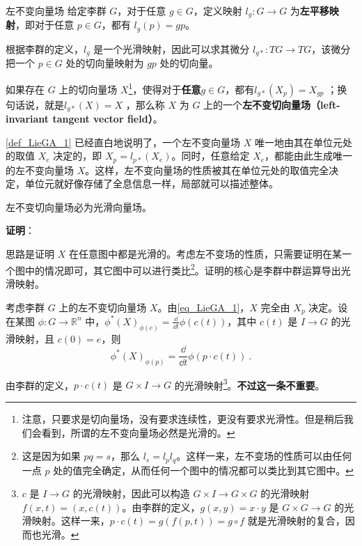 \begin{definition}{左不变向量场}\label{def_LieGA_1}
给定李群 $G$，对于任意 $g\in G$，定义映射 $l_g:G\to G$ 为\textbf{左平移映射}，即对于任意 $p\in G$，都有 $l_g(p)=gp$。

根据李群的定义，$l_g$ 是一个光滑映射，因此可以求其微分 $l_{g*}:TG\to TG$，该微分把一个 $p\in G$ 处的切向量映射为 $gp$ 处的切向量。

如果存在 $G$ 上的切向量场 $X$\footnote{注意，只要求是切向量场，没有要求连续性，更没有要求光滑性。但是稍后我们会看到，所谓的左不变向量场必然是光滑的。}，使得对于\textbf{任意}$g\in G$，都有$l_{g*}(X_p)=X_{gp}$ ；换句话说，就是$l_{g*}(X)=X$ ，那么称 $X$ 为 $G$ 上的一个\textbf{左不变切向量场（left-invariant tangent vector field）}。
\end{definition}

\autoref{def_LieGA_1} 已经直白地说明了，一个左不变向量场 $X$ 唯一地由其在单位元处的取值 $X_e$ 决定的，即 $X_p=l_{p*}(X_e)$。同时，任意给定 $X_e$，都能由此生成唯一的左不变向量场 $X$。这样，左不变向量场的性质被其在单位元处的取值完全决定，单位元就好像存储了全息信息一样，局部就可以描述整体。

\begin{theorem}{}
左不变切向量场必为光滑向量场。
\end{theorem}

\textbf{证明}：




思路是证明 $X$ 在任意图中都是光滑的。考虑左不变场的性质，只需要证明在某一个图中的情况即可，其它图中可以进行类比\footnote{这是因为如果 $pq=s$，那么 $l_{s}=l_pl_q$。这样一来，左不变场的性质可以由任何一点 $p$ 处的值完全确定，从而任何一个图中的情况都可以类比到其它图中。}。证明的核心是李群中群运算导出光滑映射。

考虑李群 $G$ 上的左不变切向量场 $X$。由\autoref{eq_LieGA_1}，$X$ 完全由 $X_p$ 决定。设在某图 $\phi: G\to\mathbb{R}^n$ 中，$\phi^*(X)_{\phi(e)}=\frac{\dd }{\dd t}\phi(c(t))$，其中 $c(t)$ 是 $I\to G$ 的光滑映射，且 $c(0)=e$，则
\begin{equation}\label{eq_LieGA_2}
\phi^*(X)_{\phi(p)}=\frac{\dd}{\dd t}\phi(p\cdot c(t))~.
\end{equation}

由李群的定义，$p\cdot c(t)$ 是 $G\times I\to G$ 的光滑映射\footnote{$c$ 是 $I\to G$ 的光滑映射，因此可以构造 $G\times I\to G\times G$ 的光滑映射 $f(x, t)=(x, c(t))$。由李群的定义，$g(x, y)=x\cdot y$ 是 $G\times G\to G$ 的光滑映射。这样一来，$p\cdot c(t)=g(f(p, t))=g\circ f$ 就是光滑映射的复合，因而也光滑。}。\textbf{不过这一条不重要}。

